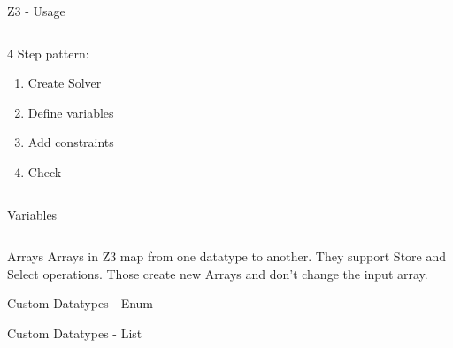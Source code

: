 \documentclass[t, ]{beamer}
\begin{document}
\begin{frame}{Z3 - Usage}
	
	
	\begin{columns}
		\begin{column}{0.4\textwidth}
			4 Step pattern:
			\begin{enumerate}
				\item Create Solver
				\item Define variables
				\item Add constraints
				\item Check
			\end{enumerate}
		\end{column}
		\begin{column}{0.6\textwidth}
			\pause
			
			
		\end{column}
		
	\end{columns}
\end{frame}


\begin{frame}{Variables}
	
	\begin{columns}
		\begin{column}{0.4\textwidth}
			
		\end{column}
		\begin{column}{0.6\textwidth}
			
			
		\end{column}
		
	\end{columns}
	
	
\end{frame}

\begin{frame}{Arrays}
	Arrays in Z3 map from one datatype to another. They support Store and Select operations. Those create new Arrays and don't change the input array.
	
	
\end{frame}

\begin{frame}{Custom Datatypes - Enum}
	
\end{frame}


\begin{frame}{Custom Datatypes - List}
	
\end{frame}
\end{document}
